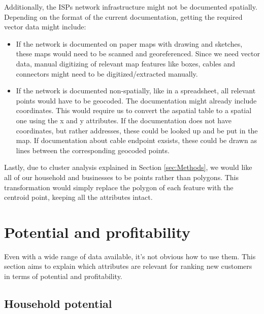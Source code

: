 \documentclass[twocolumn]{article}
\begin{document}
Additionally, the ISPs network infrastructure might not be documented spatially. Depending on the format of the current documentation, getting the required vector data might include:
\begin{itemize}
  \item If the network is documented on paper maps with drawing and sketches, these maps would need to be scanned and georeferenced. Since we need vector data, manual digitizing of relevant map features like boxes, cables and connectors might need to be digitized/extracted manually.
  \item If the network is documented non-spatially, like in a spreadsheet, all relevant points would have to be geocoded. The documentation might already include coordinates. This would require us to convert the aspatial table to a spatial one using the x and y attributes. If the documentation does not have coordinates, but rather addresses, these could be looked up and be put in the map. If documentation about cable endpoint exsists, these could be drawn as lines between the corresponding geocoded points.
  \end{itemize}

Lastly, due to cluster analysis explained in Section \ref{sec:Methods}, we would like all of our household and businesses to be points rather than polygons. This transformation would simply replace the polygon of each feature with the centroid point, keeping all the attributes intact.


\section{Potential and profitability}
\label{sec:Potential and profitability}
Even with a wide range of data available, it's not obvious how to use them. This section aims to explain which attributes are relevant for ranking new customers in terms of potential and profitability.

\subsection{Household potential}
\label{sub:Potential}
\end{document}
